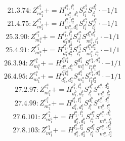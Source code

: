 \documentclass[letterpaper,10pt,fleqn,leqno,onecolumn]{article}
\begin{document}
\begin{equation} \;\;\;\;\;\;  21.3.74: Z^{e_{1}^{a}}_{m_{1}^{a}}+=H^{l_{1}^{a},l_{1}^{b}}_{m_{1}^{a},d_{1}^{b}}S^{e_{1}^{a}}_{l_{1}^{a}}S^{d_{1}^{b}}_{l_{1}^{b}}\cdot -1/1 \end{equation}
\begin{equation} \;\;\;\;\;\;  21.4.75: Z^{e_{1}^{a}}_{m_{1}^{a}}+=H^{l_{1}^{a},l_{2}^{a}}_{m_{1}^{a},d_{1}^{a}}S^{e_{1}^{a}}_{l_{1}^{a}}S^{d_{1}^{a}}_{l_{2}^{a}}\cdot -1/1 \end{equation}
\begin{equation} \;\;\;\;\;\;  25.3.90: Z^{e_{1}^{a}}_{m_{1}^{a}}+=H^{l_{1}^{a},l_{1}^{b}}_{d_{1}^{a}d_{1}^{b}}S^{e_{1}^{a}}_{l_{1}^{a}}S^{d_{1}^{a}d_{1}^{b}}_{m_{1}^{a},l_{1}^{b}}\cdot -1/1 \end{equation}
\begin{equation} \;\;\;\;\;\;  25.4.91: Z^{e_{1}^{a}}_{m_{1}^{a}}+=H^{l_{1}^{a},l_{2}^{a}}_{d_{1}^{a}d_{2}^{a}}S^{e_{1}^{a}}_{l_{1}^{a}}S^{d_{1}^{a}d_{2}^{a}}_{m_{1}^{a},l_{2}^{a}}\cdot -1/1 \end{equation}
\begin{equation} \;\;\;\;\;\;  26.3.94: Z^{e_{1}^{a}}_{m_{1}^{a}}+=H^{l_{1}^{a}l_{1}^{b}}_{d_{1}^{a},d_{1}^{b}}S^{d_{1}^{a}}_{m_{1}^{a}}S^{e_{1}^{a},d_{1}^{b}}_{l_{1}^{a}l_{1}^{b}}\cdot -1/1 \end{equation}
\begin{equation} \;\;\;\;\;\;  26.4.95: Z^{e_{1}^{a}}_{m_{1}^{a}}+=H^{l_{1}^{a}l_{2}^{a}}_{d_{1}^{a},d_{2}^{a}}S^{d_{1}^{a}}_{m_{1}^{a}}S^{e_{1}^{a},d_{2}^{a}}_{l_{1}^{a}l_{2}^{a}}\cdot -1/1 \end{equation}
\begin{equation} \;\;\;\;\;\;  27.2.97: Z^{e_{1}^{a}}_{m_{1}^{a}}+=H^{l_{1}^{b},l_{2}^{b}}_{d_{1}^{b},d_{2}^{b}}S^{d_{1}^{b}}_{l_{1}^{b}}S^{e_{1}^{a},d_{2}^{b}}_{m_{1}^{a},l_{2}^{b}} \end{equation}
\begin{equation} \;\;\;\;\;\;  27.4.99: Z^{e_{1}^{a}}_{m_{1}^{a}}+=H^{l_{1}^{b},l_{1}^{a}}_{d_{1}^{b},d_{1}^{a}}S^{d_{1}^{b}}_{l_{1}^{b}}S^{e_{1}^{a},d_{1}^{a}}_{m_{1}^{a},l_{1}^{a}} \end{equation}
\begin{equation} \;\;\;\;\;\;  27.6.101: Z^{e_{1}^{a}}_{m_{1}^{a}}+=H^{l_{1}^{a},l_{1}^{b}}_{d_{1}^{a},d_{1}^{b}}S^{d_{1}^{a}}_{l_{1}^{a}}S^{e_{1}^{a},d_{1}^{b}}_{m_{1}^{a},l_{1}^{b}} \end{equation}
\begin{equation} \;\;\;\;\;\;  27.8.103: Z^{e_{1}^{a}}_{m_{1}^{a}}+=H^{l_{1}^{a},l_{2}^{a}}_{d_{1}^{a},d_{2}^{a}}S^{d_{1}^{a}}_{l_{1}^{a}}S^{e_{1}^{a},d_{2}^{a}}_{m_{1}^{a},l_{2}^{a}} \end{equation}
\end{document}
